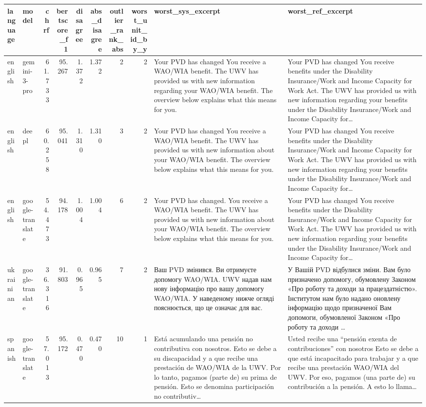 \begin{tabular}{llrrrrrrll}
\toprule
language & model & chrf & bertscore\_f1 & disagree & abs\_disagree & outlier\_rank\_abs & worst\_unit\_id\_by\_y & worst\_sys\_excerpt & worst\_ref\_excerpt \\
\midrule
english & gemini-3-pro & 61.733 & 95.267 & 1.372 & 1.372 & 2 & 2 & Your PVD has changed You receive a WAO/WIA benefit. The UWV has provided us with new information regarding your WAO/WIA benefit. The overview below explains what this means for you. & Your PVD has changed You receive benefits under the Disability Insurance/Work and Income Capacity for Work Act. The UWV has provided us with new information regarding your benefits under the Disability Insurance/Work and Income Capacity for… \\
english & deepl & 60.258 & 95.041 & 1.310 & 1.310 & 3 & 2 & Your PVD has changed You receive a WAO/WIA benefit. The UWV has provided us with new information about your WAO/WIA benefit. The overview below explains what this means for you. & Your PVD has changed You receive benefits under the Disability Insurance/Work and Income Capacity for Work Act. The UWV has provided us with new information regarding your benefits under the Disability Insurance/Work and Income Capacity for… \\
english & google-translate & 54.473 & 94.178 & 1.004 & 1.004 & 6 & 2 & Your PVD has changed. You receive a WAO/WIA benefit. The UWV has provided us with new information about your WAO/WIA benefit. The overview below explains what this means for you. & Your PVD has changed You receive benefits under the Disability Insurance/Work and Income Capacity for Work Act. The UWV has provided us with new information regarding your benefits under the Disability Insurance/Work and Income Capacity for… \\
ukrainian & google-translate & 36.316 & 91.803 & 0.965 & 0.965 & 7 & 2 & Ваш PVD змінився. Ви отримуєте допомогу WAO/WIA. UWV надав нам нову інформацію про вашу допомогу WAO/WIA. У наведеному нижче огляді пояснюється, що це означає для вас. & У Вашій PVD відбулися зміни. Вам було призначено допомогу, обумовлену Законом «Про роботу та доходи за працездатністю». Інститутом нам було надано оновлену інформацію щодо призначеної Вам допомоги, обумовленої Законом «Про роботу та доходи … \\
spanish & google-translate & 57.013 & 95.172 & 0.470 & 0.470 & 10 & 1 & Está acumulando una pensión no contributiva con nosotros. Esto se debe a su discapacidad y a que recibe una prestación de WAO/WIA de la UWV. Por lo tanto, pagamos (parte de) su prima de pensión. Esto se denomina participación no contributiv… & Usted recibe una “pensión exenta de contribuciones” con nosotros Esto se debe a que está incapacitado para trabajar y a que recibe una prestación WAO/WIA del UWV. Por eso, pagamos (una parte de) su contribución a la pensión. A esto lo llama… \\

\end{tabular}
